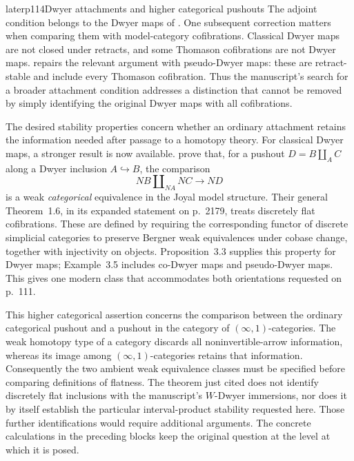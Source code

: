 \begin{dcomment}{later}{p114}{Dwyer attachments and higher categorical pushouts}
The adjoint condition belongs to the Dwyer maps of \citet[Definition~4.1 and Proposition~4.3]{Thomason1980}. One subsequent correction matters when comparing them with model-category cofibrations. Classical Dwyer maps are not closed under retracts, and some Thomason cofibrations are not Dwyer maps. \citet[Definition~1, Lemma~4 and Proposition~2]{Cisinski1999Dwyer} repairs the relevant argument with pseudo-Dwyer maps: these are retract-stable and include every Thomason cofibration. Thus the manuscript's search for a broader attachment condition addresses a distinction that cannot be removed by simply identifying the original Dwyer maps with all cofibrations.

The desired stability properties concern whether an ordinary attachment retains the information needed after passage to a homotopy theory. For classical Dwyer maps, a stronger result is now available. \citet[Theorem~1.5]{HackneyOzornovaRiehlRovelli2024} prove that, for a pushout $D=B\amalg_A C$ along a Dwyer inclusion $A\hookrightarrow B$, the comparison
\[
 NB\amalg_{NA}NC\longrightarrow ND
\]
is a weak \emph{categorical} equivalence in the Joyal model structure. Their general Theorem~1.6, in its expanded statement on p.~2179, treats discretely flat cofibrations. These are defined by requiring the corresponding functor of discrete simplicial categories to preserve Bergner weak equivalences under cobase change, together with injectivity on objects. Proposition~3.3 supplies this property for Dwyer maps; Example~3.5 includes co-Dwyer maps and pseudo-Dwyer maps. This gives one modern class that accommodates both orientations requested on p.~111.

This higher categorical assertion concerns the comparison between the ordinary categorical pushout and a pushout in the category of $(\infty,1)$-categories. The weak homotopy type of a category discards all noninvertible-arrow information, whereas its image among $(\infty,1)$-categories retains that information. Consequently the two ambient weak equivalence classes must be specified before comparing definitions of flatness. The theorem just cited does not identify discretely flat inclusions with the manuscript's $W$-Dwyer immersions, nor does it by itself establish the particular interval-product stability requested here. Those further identifications would require additional arguments. The concrete calculations in the preceding blocks keep the original question at the level at which it is posed.
\end{dcomment}

